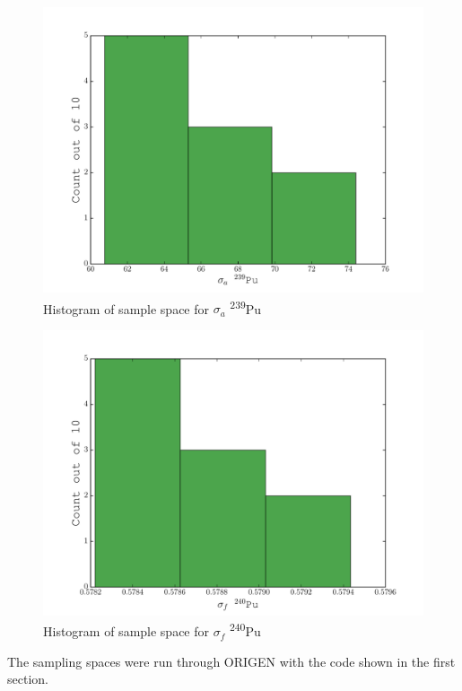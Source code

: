 \documentclass[11pt,notitlepage]{article}
\newcommand{\tss}{\textsuperscript}
\begin{document}
\begin{todolist}
  \begin{figure}[H]
    \begin{center}
      \includegraphics[width=0.77\columnwidth]{../Origen2/PLOTS/94Pu239aHIST.pdf}
      \vspace{-5mm}
      \caption{Histogram of sample space for $\sigma_a$ \tss{239}Pu}
      \label{fig:SPu239a}
    \end{center}
  \end{figure}

  \begin{figure}[H]
    \begin{center}
      \includegraphics[width=0.77\columnwidth]{../Origen2/PLOTS/94Pu240fHIST.pdf}
      \vspace{-5mm}
      \caption{Histogram of sample space for $\sigma_f$ \tss{240}Pu}
      \label{fig:SPu240f}
    \end{center}
  \end{figure}


  The sampling spaces were run through ORIGEN with the code
  shown in the first section.
  

\end{todolist}
\end{document}
